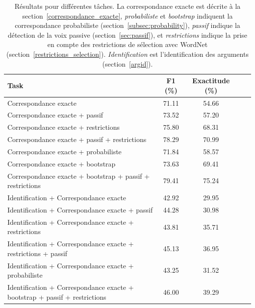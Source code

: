 \begin{table}[ht]
    \centering
    \begin{tabular}{lcccc}
        \toprule
        Task                                                       & F1 (\%) & Exactitude (\%)\\
        \midrule                                                   
        Correspondance exacte                                      & 71.11  & 54.66 \\
        Correspondance exacte + passif                             & 73.52  & 57.20 \\
        Correspondance exacte + restrictions                       & 75.80  & 68.31 \\
        Correspondance exacte + passif + restrictions              & 78.29  & 70.99 \\
        Correspondance exacte + probabiliste                       & 71.84  & 58.57 \\
        Correspondance exacte + bootstrap                          & 73.63  & 69.41 \\
        Correspondance exacte + bootstrap + passif + restrictions  & 79.41  & 75.24 \\
        \midrule
        Identification + Correspondance exacte                          & 42.92  & 29.95 \\
        Identification + Correspondance exacte + passif                 & 44.28  & 30.98 \\
        Identification + Correspondance exacte + restrictions           & 43.81  & 35.71 \\
        Identification + Correspondance exacte + restrictions + passif  & 45.13  & 36.95 \\
        Identification + Correspondance exacte + probabiliste           & 43.25  & 31.52 \\
        Identification + Correspondance exacte + bootstrap + passif + restrictions   & 46.00 & 39.29 \\
        \bottomrule
    \end{tabular}

    \caption{\label{table:results}Résultats pour différentes tâches. La
        correspondance exacte est décrite à la
        section~\ref{correspondance_exacte}, \textit{probabiliste} et
        \textit{bootstrap} indiquent la correspondance probabiliste
        (section~\ref{subsec:probability}), \textit{passif} indique la
        détection de la voix passive (section~\ref{sec:passif}), et
        \textit{restrictions} indique la prise en compte des restrictions de
        sélection avec WordNet (section~\ref{restrictions_selection}).
        \textit{Identification} est l'identification des arguments
    (section~\ref{argid}).}

\end{table}

